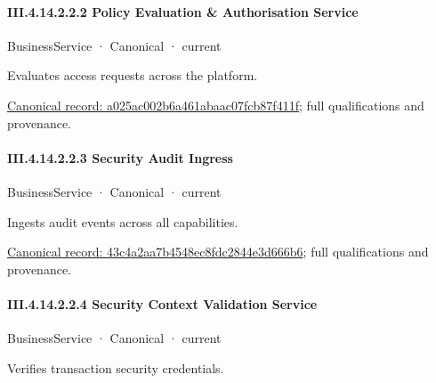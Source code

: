 \paragraph*{III.4.14.2.2.2 Policy Evaluation \& Authorisation Service}
\label{navigation:III.4.14.2.2.2}

\label{element:a025ac002b6a461abaac07fcb87f411f}
{\small BusinessService · Canonical · current}\par

Evaluates access requests across the platform.


{\footnotesize \href{../../../../continuum/business/business-service/a025ac002b6a461abaac07fcb87f411f.md}{Canonical record: a025ac002b6a461abaac07fcb87f411f}; full qualifications and provenance.}\par
\paragraph*{III.4.14.2.2.3 Security Audit Ingress}
\label{navigation:III.4.14.2.2.3}

\label{element:43c4a2aa7b4548ec8fdc2844e3d666b6}
{\small BusinessService · Canonical · current}\par

Ingests audit events across all capabilities.


{\footnotesize \href{../../../../continuum/business/business-service/43c4a2aa7b4548ec8fdc2844e3d666b6.md}{Canonical record: 43c4a2aa7b4548ec8fdc2844e3d666b6}; full qualifications and provenance.}\par
\paragraph*{III.4.14.2.2.4 Security Context Validation Service}
\label{navigation:III.4.14.2.2.4}

\label{element:f1ff9e6542004a7584a385062cb0ed21}
{\small BusinessService · Canonical · current}\par

Verifies transaction security credentials.




